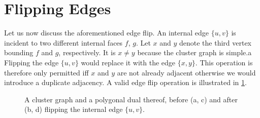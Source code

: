 \section{Flipping Edges}
\label{sect:flipping-edges}

Let us now discuss the aforementioned edge flip.
An internal edge $\{u,v\}$ is incident to two different internal faces $f$, $g$.
Let $x$ and $y$ denote the third vertex bounding $f$ and $g$, respectively.
It is $x \neq y$ because the cluster graph is simple.a
Flipping the edge $\{u,v\}$ would replace it with the edge $\{x,y\}$.
This operation is therefore only permitted iff $x$ and $y$ are not already adjacent \emdash{} otherwise we would introduce a duplicate adjacency.
A valid edge flip operation is illustrated in \cref{fig:flip-edge-example-internal}.


\begin{figure}[H]
	\centering
	\quad
	\qquad
	\quad
	\caption{A cluster graph and a polygonal dual thereof, before (a, c) and after (b, d) flipping the internal edge $\{u,v\}$.}
	\label{fig:flip-edge-example-internal}
\end{figure}

